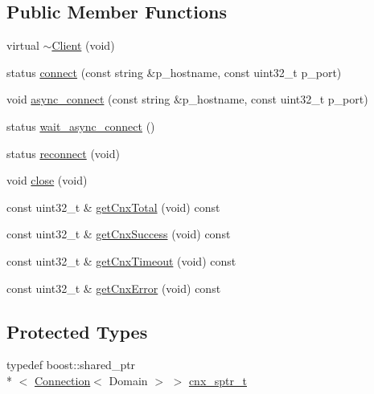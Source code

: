 \subsection*{Public Member Functions}
\begin{DoxyCompactItemize}
\item 
virtual \hyperlink{classxtd_1_1network_1_1base_1_1Client_a890cd6837ad0ccd2bf928f171e7696d0}{$\sim$\-Client} (void)
\item 
status \hyperlink{classxtd_1_1network_1_1base_1_1Client_abf9740f4b9eed341858ad27018cc4469}{connect} (const string \&p\-\_\-hostname, const uint32\-\_\-t p\-\_\-port)
\item 
void \hyperlink{classxtd_1_1network_1_1base_1_1Client_ac7427711e506f5958f80a89028f3f923}{async\-\_\-connect} (const string \&p\-\_\-hostname, const uint32\-\_\-t p\-\_\-port)
\item 
status \hyperlink{classxtd_1_1network_1_1base_1_1Client_ada6c4a1254620f7f5d83d3c890748300}{wait\-\_\-async\-\_\-connect} ()
\item 
status \hyperlink{classxtd_1_1network_1_1base_1_1Client_a268f40287ee277801cad202fa1380970}{reconnect} (void)
\item 
void \hyperlink{classxtd_1_1network_1_1base_1_1Client_a520d6aebfcf0e0892515bc0fec3a37c7}{close} (void)
\item 
const uint32\-\_\-t \& \hyperlink{classxtd_1_1network_1_1base_1_1Client_abff34ffec3663d843d97f42a7ce73d2f}{get\-Cnx\-Total} (void) const 
\item 
const uint32\-\_\-t \& \hyperlink{classxtd_1_1network_1_1base_1_1Client_a1d72f9e19322a7c2d533422c4f9e9777}{get\-Cnx\-Success} (void) const 
\item 
const uint32\-\_\-t \& \hyperlink{classxtd_1_1network_1_1base_1_1Client_aa585da9396b4067ac2535cdc4c1acbbb}{get\-Cnx\-Timeout} (void) const 
\item 
const uint32\-\_\-t \& \hyperlink{classxtd_1_1network_1_1base_1_1Client_a3023500754c12ccfdd200706d9995fd7}{get\-Cnx\-Error} (void) const 
\end{DoxyCompactItemize}
\subsection*{Protected Types}
\begin{DoxyCompactItemize}
\item 
typedef boost\-::shared\-\_\-ptr\\*
$<$ \hyperlink{classxtd_1_1network_1_1base_1_1Connection}{Connection}$<$ Domain $>$ $>$ \hyperlink{classxtd_1_1network_1_1base_1_1Client_a3cef8310676dac754d630bcc1628ab56}{cnx\-\_\-sptr\-\_\-t}
\end{DoxyCompactItemize}
